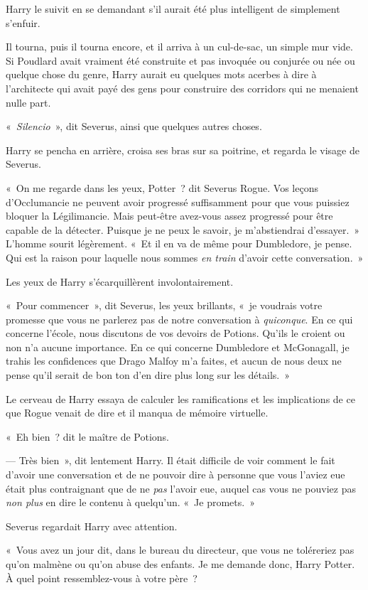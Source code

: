 Harry le suivit en se demandant s'il aurait été plus intelligent de simplement s'enfuir.

Il tourna, puis il tourna encore, et il arriva à un cul-de-sac, un simple mur vide. Si Poudlard avait vraiment été construite et pas invoquée ou conjurée ou née ou quelque chose du genre, Harry aurait eu quelques mots acerbes à dire à l'architecte qui avait payé des gens pour construire des corridors qui ne menaient nulle part.

«~\emph{Silencio}~», dit Severus, ainsi que quelques autres choses.

Harry se pencha en arrière, croisa ses bras sur sa poitrine, et regarda le visage de Severus.

«~On me regarde dans les yeux, Potter~? dit Severus Rogue. Vos leçons d'Occlumancie ne peuvent avoir progressé suffisamment pour que vous puissiez bloquer la Légilimancie. Mais peut-être avez-vous assez progressé pour être capable de la détecter. Puisque je ne peux le savoir, je m'abstiendrai d'essayer.~» L'homme sourit légèrement. «~Et il en va de même pour Dumbledore, je pense. Qui est la raison pour laquelle nous sommes \emph{en train} d'avoir cette conversation.~»

Les yeux de Harry s'écarquillèrent involontairement.

«~Pour commencer~», dit Severus, les yeux brillants, «~je voudrais votre promesse que vous ne parlerez pas de notre conversation à \emph{quiconque}. En ce qui concerne l'école, nous discutons de vos devoirs de Potions. Qu'ils le croient ou non n'a aucune importance. En ce qui concerne Dumbledore et McGonagall, je trahis les confidences que Drago Malfoy m'a faites, et aucun de nous deux ne pense qu'il serait de bon ton d'en dire plus long sur les détails.~»

Le cerveau de Harry essaya de calculer les ramifications et les implications de ce que Rogue venait de dire et il manqua de mémoire virtuelle.

«~Eh bien~? dit le maître de Potions.

--- Très bien~», dit lentement Harry. Il était difficile de voir comment le fait d'avoir une conversation et de ne pouvoir dire à personne que vous l'aviez eue était plus contraignant que de ne \emph{pas} l'avoir eue, auquel cas vous ne pouviez pas \emph{non plus} en dire le contenu à quelqu'un. «~Je promets.~»

Severus regardait Harry avec attention.

«~Vous avez un jour dit, dans le bureau du directeur, que vous ne toléreriez pas qu'on malmène ou qu'on abuse des enfants. Je me demande donc, Harry Potter. À quel point ressemblez-vous à votre père~?

